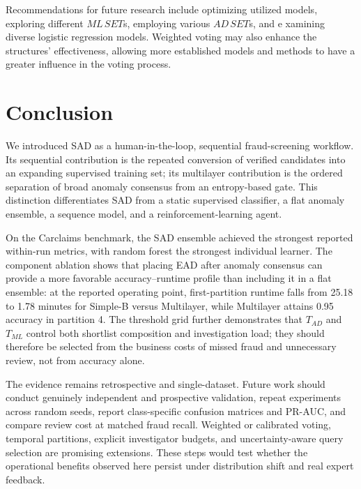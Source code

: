 \documentclass[12pt]{article}
\begin{document}
Recommendations for future research include optimizing utilized
models, exploring different $ML\, SET$s, employing various $AD\, SET $s, and e	xamining diverse logistic regression models. Weighted
voting may also enhance the structures' effectiveness, allowing
more established models and methods to have a greater influence in
the voting process.
\fi

\section{Conclusion}\label{SC:CONCLUSION}
We introduced SAD as a human-in-the-loop, sequential fraud-screening workflow.
Its sequential contribution is the repeated conversion of verified candidates
into an expanding supervised training set; its multilayer contribution is the
ordered separation of broad anomaly consensus from an entropy-based gate. This
distinction differentiates SAD from a static supervised classifier, a flat
anomaly ensemble, a sequence model, and a reinforcement-learning agent.

On the Carclaims benchmark, the SAD ensemble achieved the strongest reported
within-run metrics, with random forest the strongest individual learner. The
component ablation shows that placing EAD after anomaly consensus can provide a
more favorable accuracy--runtime profile than including it in a flat ensemble:
at the reported operating point, first-partition runtime falls from 25.18 to
1.78 minutes for Simple-B versus Multilayer, while Multilayer attains 0.95
accuracy in partition 4. The threshold grid further demonstrates that
$T_{AD}$ and $T_{ML}$ control both shortlist composition and investigation
load; they should therefore be selected from the business costs of missed fraud
and unnecessary review, not from accuracy alone.

The evidence remains retrospective and single-dataset. Future work should
conduct genuinely independent and prospective validation, repeat experiments
across random seeds, report class-specific confusion matrices and PR-AUC, and
compare review cost at matched fraud recall. Weighted or calibrated voting,
temporal partitions, explicit investigator budgets, and uncertainty-aware
query selection are promising extensions. These steps would test whether the
operational benefits observed here persist under distribution shift and real
expert feedback.

\baselineskip12pt

\end{document}
